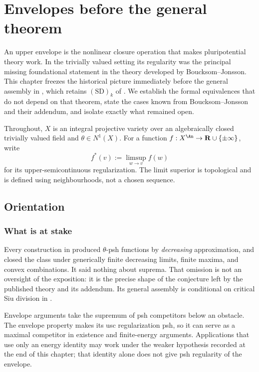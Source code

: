 \chapter{Envelopes before the general theorem}
\label{chap:bj-envelope-history}

An upper envelope is the nonlinear closure operation that makes
pluripotential theory work.  In the trivially valued setting its regularity
was the principal missing foundational statement in the theory developed by
Boucksom--Jonsson.  This chapter freezes the historical picture immediately
before the general assembly in
,
which retains $\mathrm{(SD)}_k$ of . We
establish the formal equivalences that do not depend on
that theorem, state the cases known from Boucksom--Jonsson and their
addendum, and isolate exactly what remained open.

Throughout, $X$ is an integral projective variety over an algebraically
closed trivially valued field and $\theta\in N^1(X)$.  For a function
$f:X^{\An}\to\mathbf R\cup\{\pm\infty\}$, write
\[
 f^*(v):=\limsup_{w\to v}f(w)
\tag{36.1}\label{eq:bj-usc-regularization}
\]
for its upper-semicontinuous regularization.  The limit superior is
topological and is defined using neighbourhoods, not a chosen sequence.


\section{Orientation}
\label{sec:ch36-orientation}

\subsection{What is at stake}

Every construction in  produced $\theta$-psh
functions by \emph{decreasing} approximation, and
 closed the class under generically finite
decreasing limits, finite maxima, and convex combinations.  It said nothing
about suprema.
That omission is not an oversight of the exposition: it is the precise shape
of the conjecture left by the published theory and its addendum. Its general
assembly is conditional on critical Siu division in
.

Envelope arguments take the supremum of psh competitors below an obstacle.
The envelope property makes its usc regularization psh, so it can serve as a
maximal competitor in existence and finite-energy arguments. Applications
that use only an energy identity may work under the weaker hypothesis
recorded at the end of this chapter; that identity alone does not give psh
regularity of the envelope.

